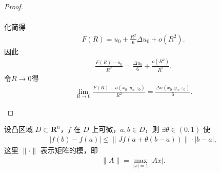 \documentclass[../../main.tex]{subfiles}%
\begin{document}
\begin{proof}
\begin{enumerate}[(1)]
\begin{align*}
\end{align*}
化简得
\begin{align*}
F(R) = u_0 + \frac{R^2}{6} \Delta u_0 + o(R^2).
\end{align*}
因此
\begin{align*}
\frac{F(R) - u_0}{R^2} = \frac{\Delta u_0}{6} + \frac{o(R^2)}{R^2}.
\end{align*}
令\(R \to 0\)得
\begin{align*}
\lim\limits_{R \to 0} \frac{F(R) - u(x_0, y_0, z_0)}{R^2} = \frac{\Delta u(x_0, y_0, z_0)}{6}.
\end{align*}
\end{enumerate}
\end{proof}

\begin{theorem}[拟微分平均值定理]
设凸区域 $D\subset \mathbf{R}^{n}$，$f$ 在 $D$ 上可微，$a,b\in D$，则 $\exists \theta \in (0,1)$ 使
\begin{align*}
|f(b) - f(a)| \leqslant \| Jf(a + \theta (b - a))\| \cdot |b - a|,
\end{align*}
这里 $\| \cdot \|$ 表示矩阵的模，即
\begin{align*}
\| A\| = \max_{|x| = 1}|Ax|.
\end{align*}
\end{theorem}
\end{document}
